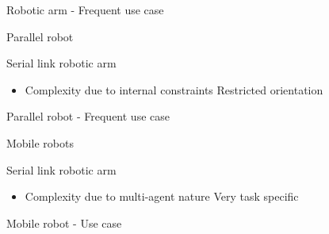 \documentclass[usenames,dvipsnames,xcolor=table]{beamer}
\begin{document}
\begin{frame}{Robotic arm - Frequent use case}
    \begin{center}
    \end{center}
\end{frame}
\begin{frame}{Parallel robot}
    \begin{center}
        \begin{minipage}{0.49\linewidth}
                \def\svgwidth{\linewidth}
                
        \end{minipage}
        \hfill
        \begin{minipage}{0.49\linewidth}
        \large{Serial link robotic arm}
        \begin{itemize}
            \pro Speed \& precision
            \pro Large 	work-space
            \item[]
            \con Complexity due to internal constraints
            \con Restricted orientation
        \end{itemize}
        \end{minipage}
    \end{center}
\end{frame}

\begin{frame}{Parallel robot - Frequent use case}
    \begin{center}
    \end{center}
\end{frame}
\begin{frame}{Mobile robots}
    \begin{center}
        \begin{minipage}{0.49\linewidth}
                \def\svgwidth{\linewidth}
                
        \end{minipage}
        \hfill
        \begin{minipage}{0.49\linewidth}
        \large{Serial link robotic arm}
        \begin{itemize}
            \pro Increases efficiency in warehouses
            \pro Semi-autonomous systems
            \item[]
            \con Complexity due to multi-agent nature
            \con Very task specific
        \end{itemize}
        \end{minipage}
    \end{center}
\end{frame}

\begin{frame}{Mobile robot - Use case}
    \begin{center}
    \end{center}
\end{frame}

\end{document}

